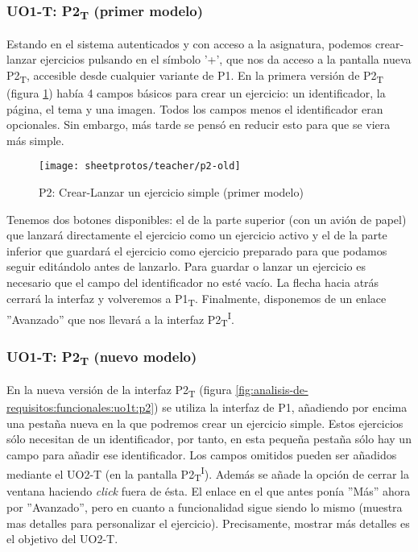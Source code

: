 \subsubsection{UO1-T: P2\textsubscript{T} (primer modelo)}

Estando en el sistema autenticados y con acceso a la asignatura, podemos crear-lanzar ejercicios pulsando en el símbolo '+', que nos da acceso a la pantalla nueva P2\textsubscript{T}, accesible desde cualquier variante de P1. En la primera versión de P2\textsubscript{T} (figura \ref{fig:analisis-de-requisitos:funcionales:uo1t:p2-viejo}) había 4 campos básicos para crear un ejercicio: un identificador, la página, el tema y una imagen. Todos los campos menos el identificador eran opcionales. Sin embargo, más tarde se pensó en reducir esto para que se viera más simple.\\

\begin{figure}[!htbp]
	\centering
	\texttt{[image: sheetprotos/teacher/p2-old]}
	\caption{P2: Crear-Lanzar un ejercicio simple (primer modelo)}
	\label{fig:analisis-de-requisitos:funcionales:uo1t:p2-viejo}
\end{figure}

Tenemos dos botones disponibles: el de la parte superior (con un avión de papel) que lanzará directamente el ejercicio como un ejercicio activo y el de la parte inferior que guardará el ejercicio como ejercicio preparado para que podamos seguir editándolo antes de lanzarlo. Para guardar o lanzar un ejercicio es necesario que el campo del identificador no esté vacío. La flecha hacia atrás cerrará la interfaz y volveremos a P1\textsubscript{T}. Finalmente, disponemos de un enlace ''Avanzado'' que nos llevará a la interfaz P2\textsubscript{T}\textsuperscript{I}.\\

\subsubsection{UO1-T: P2\textsubscript{T} (nuevo modelo)}

En la nueva versión de la interfaz P2\textsubscript{T} (figura \ref{fig:analisis-de-requisitos:funcionales:uo1t:p2}) se utiliza la interfaz de P1, añadiendo por encima una pestaña nueva en la que podremos crear un ejercicio simple. Estos ejercicios sólo necesitan de un identificador, por tanto, en esta pequeña pestaña sólo hay un campo para añadir ese identificador. Los campos omitidos pueden ser añadidos mediante el UO2-T (en la pantalla P2\textsubscript{T}\textsuperscript{I}). Además se añade la opción de cerrar la ventana haciendo \textit{click} fuera de ésta. El enlace en el que antes ponía ''Más'' ahora por ''Avanzado'', pero en cuanto a funcionalidad sigue siendo lo mismo (muestra mas detalles para personalizar el ejercicio). Precisamente, mostrar más detalles es el objetivo del UO2-T.\\

